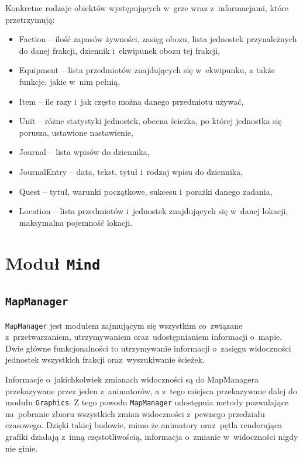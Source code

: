 \documentclass[licencjacka]{pracamgr}
\begin{document}
    Konkretne rodzaje obiektów występujących w~grze wraz z~informacjami, które przetrzymują:
    \begin{itemize}
      \item Faction -- ilość zapasów żywności, zasięg obozu, lista jednostek przynależnych do danej
	frakcji, dziennik i~ekwipunek obozu tej frakcji,
      \item Equipment -- lista przedmiotów znajdujących się w~ekwipunku, a także funkcje, jakie w~nim pełnią,
      \item Item --  ile razy i~jak często można danego przedmiotu używać,
      \item Unit -- różne statystyki jednostek, obecna ścieżka, po której jednostka się porusza, ustawione nastawienie,
      \item Journal -- lista wpisów do dziennika,
      \item JournalEntry -- data, tekst, tytuł i~rodzaj wpisu do dziennika,
      \item Quest -- tytuł, warunki początkowe, sukcesu i~porażki danego zadania,
      \item Location -- lista przedmiotów i~jednostek znajdujących się w~danej lokacji, maksymalna pojemność lokacji.
    \end{itemize}

  \section{Moduł \texttt{Mind}}
    \subsection{\texttt{MapManager}}
      \texttt{MapManager} jest modułem zajmującym się wszystkim co~związane z~przetwarzaniem, utrzymywaniem oraz~udostępnianiem
      informacji o~mapie. Dwie główne funkcjonalności to utrzymywanie informacji o~zasięgu widoczności jednostek wszystkich
      frakcji oraz~wyszukiwanie ścieżek.

      Informacje o~jakichkolwiek zmianach widoczności są do MapManagera przekazywane przez jeden z~animatorów, a z~tego miejsca
      przekazywane dalej do modułu \texttt{Graphics}. Z tego powodu \texttt{MapManager} udostępnia metody pozwalające na~pobranie
      zbioru wszystkich zmian widoczności z~pewnego przedziału czasowego. Dzięki takiej budowie, mimo że animatory oraz~pętla 
      renderująca grafiki działają z~inną częstotliwością, informacja o~zmianie w~widoczności nigdy nie ginie.
\end{document}
